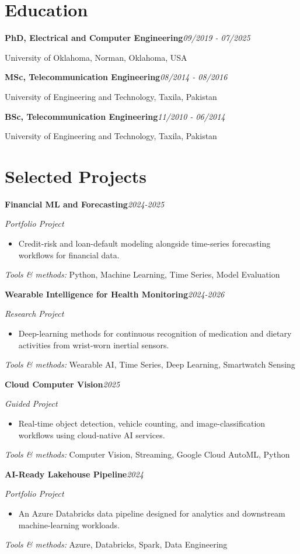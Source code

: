 \documentclass[9pt,letterpaper]{extarticle}
\newcommand{\entry}[2]{\Needspace{4\baselineskip}\textbf{#1}\hfill\textit{#2}\par}
\begin{document}
\section{Education}
\entry{PhD, Electrical and Computer Engineering}{09/2019 - 07/2025}
University of Oklahoma, Norman, Oklahoma, USA\par
\entry{MSc, Telecommunication Engineering}{08/2014 - 08/2016}
University of Engineering and Technology, Taxila, Pakistan\par
\entry{BSc, Telecommunication Engineering}{11/2010 - 06/2014}
University of Engineering and Technology, Taxila, Pakistan\par
{}
\section{Selected Projects}
\entry{Financial ML and Forecasting}{2024-2025}
\textit{Portfolio Project}\par
\begin{itemize}
\item Credit-risk and loan-default modeling alongside time-series forecasting workflows for financial data.
\end{itemize}
{\small\textit{Tools \& methods:} Python, Machine Learning, Time Series, Model Evaluation\par}
\entry{Wearable Intelligence for Health Monitoring}{2024-2026}
\textit{Research Project}\par
\begin{itemize}
\item Deep-learning methods for continuous recognition of medication and dietary activities from wrist-worn inertial sensors.
\end{itemize}
{\small\textit{Tools \& methods:} Wearable AI, Time Series, Deep Learning, Smartwatch Sensing\par}
\entry{Cloud Computer Vision}{2025}
\textit{Guided Project}\par
\begin{itemize}
\item Real-time object detection, vehicle counting, and image-classification workflows using cloud-native AI services.
\end{itemize}
{\small\textit{Tools \& methods:} Computer Vision, Streaming, Google Cloud AutoML, Python\par}
\entry{AI-Ready Lakehouse Pipeline}{2024}
\textit{Portfolio Project}\par
\begin{itemize}
\item An Azure Databricks data pipeline designed for analytics and downstream machine-learning workloads.
\end{itemize}
{\small\textit{Tools \& methods:} Azure, Databricks, Spark, Data Engineering\par}
\end{document}
